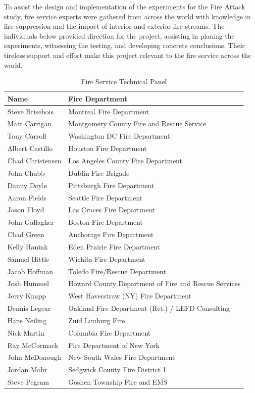 \documentclass[12pt,oneside]{book}
\begin{document}
\clearpage

To assist the design and implementation of the experiments for the Fire Attack study, fire service experts were gathered from across the world with knowledge in fire suppression and the impact of interior and exterior fire streams. The individuals below provided direction for the project, assisting in planing the experiments, witnessing the testing, and developing concrete conclusions. Their tireless support and effort make this project relevant to the fire service across the world. 


\begin{table}[!ht]
	\centering
	\caption*{Fire Service Technical Panel}
	\begin{tabular}{ll}
		\toprule[1.5pt]
		Name & Fire Department \\ 
		\midrule
		Steve Brisebois  & Montreal Fire Department \\ 
		Matt Carrigan    & Montgomery County Fire and Rescue Service \\ 
		Tony Carroll     & Washington DC Fire Department \\ 
		Albert Castillo  & Houston Fire Department \\ 
		Chad Christensen & Los Angeles County Fire Department \\ 
		John Chubb       & Dublin Fire Brigade \\ 		 		  
		Danny Doyle      & Pittsburgh Fire Department \\ 
		Aaron Fields     & Seattle Fire Department \\ 
		Jason Floyd      & Las Cruces Fire Department \\ 
		John Gallagher   & Boston Fire Department \\ 
		Chad Green       & Anchorage Fire Department \\ 
		Kelly Hanink     & Eden Prairie Fire Department \\ 
		Samuel Hittle    & Wichita Fire Department \\ 
		Jacob Hoffman    & Toledo Fire/Rescue Department \\ 
		Josh Hummel      & Howard County Department of Fire and Rescue Services \\ 
		Jerry Knapp      & West Haverstraw (NY) Fire Department \\ 
		Dennis Legear    & Oakland Fire Department (Ret.) / LEFD Consulting\\ 
		Hans Neiling     & Zuid Limburg Fire \\ 
		Nick Martin      & Columbia Fire Department \\ 
		Ray McCormack    & Fire Department of New York \\ 
		John McDonough   & New South Wales Fire Department \\ 
		Jordan Mohr      & Sedgwick County Fire District 1 \\ 
		Steve Pegram     & Goshen Township Fire and EMS \\ 
		\bottomrule[1.25pt]
	\end{tabular}
\end{table}
\end{document}
